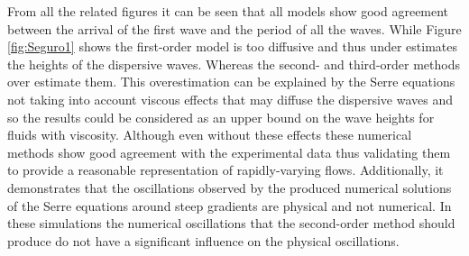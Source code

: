\documentclass[SingleSpace,12pt,Proceedings]{Serre_ASCE}
\begin{document}
From all the related figures it can be seen that all models show good agreement between the arrival of the first wave and the period of all the waves. While Figure \ref{fig:Seguro1} shows the first-order model is too diffusive and thus under estimates the heights of the dispersive waves. Whereas the second- and third-order methods over estimate them. This overestimation can be explained by the Serre equations not taking into account viscous effects that may diffuse the dispersive waves and so the results could be considered as an upper bound on the wave heights for fluids with viscosity. Although even without these effects these numerical methods show good agreement with the experimental data thus validating them to provide a reasonable representation of rapidly-varying flows. Additionally, it demonstrates that the oscillations observed by the produced numerical solutions of the Serre equations around steep gradients are physical and not numerical. In these simulations the numerical oscillations that the second-order method should produce \cite{Zoppou-Roberts-1996} do not have a significant influence on the physical oscillations.
\end{document}
